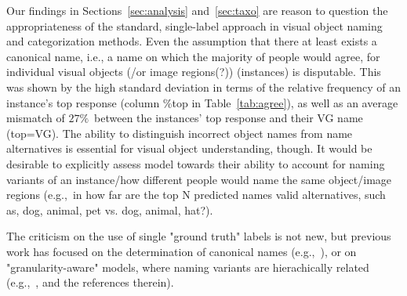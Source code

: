 
Our findings in Sections~\ref{sec:analysis} and~\ref{sec:taxo} are reason to question the appropriateness of the standard, single-label approach in visual object naming and categorization methods. 
Even the assumption that there at least exists a canonical name, i.e., a  name on which the majority of people would agree, for individual visual objects (/or image regions(?)) (instances) is disputable. 
This was shown by the high standard deviation in terms of the relative frequency of an instance's top response (column \%top in Table~\ref{tab:agree}), as well as an average mismatch of $27\%$~between the instances' top response and their VG name (\mbox{top=VG}). 
%
The ability to distinguish incorrect object names from name alternatives is essential for visual object understanding, though. 
It would be desirable to explicitly assess model towards their ability to account for naming variants of an instance/how different people would name the same object/image regions (e.g.,~in how far are the top N predicted names valid alternatives, such as, dog, animal, pet vs. dog, animal, hat?). 
%

The criticism on the use of single "ground truth" labels is not new, but %
previous work has focused on the determination of canonical names (e.g.,~), or on "granularity-aware" models, where naming variants are hierachically related (e.g.,~, and the references therein). 

